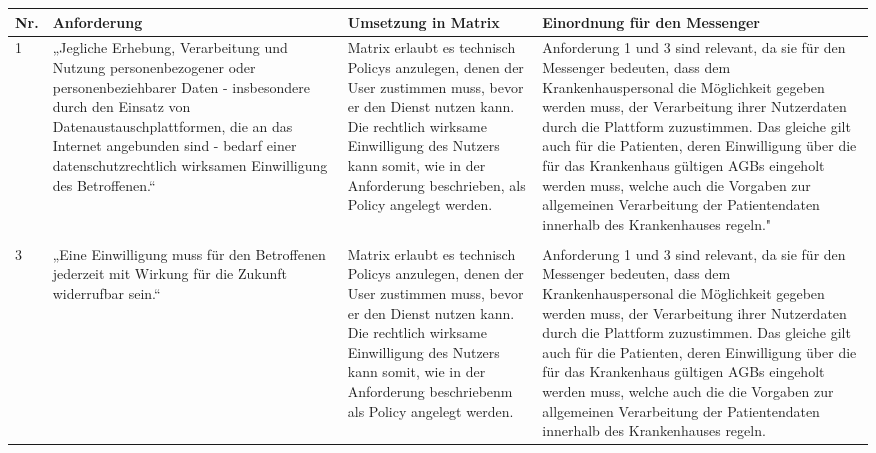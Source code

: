 \begin{longtable}{p{0.6cm}|p{4cm}|p{5cm}|p{5cm}}
    \hline
Nr. & Anforderung                                                                                                                                                                                                                                                                                          & Umsetzung in Matrix          & Einordnung für den Messenger                                                                                                                                                                                                                                                                                                                                                                                                                                                                                                                                        \\ \hline
1 &
  „Jegliche Erhebung, Verarbeitung und Nutzung personenbezogener oder personenbeziehbarer Daten - insbesondere durch den Einsatz von Datenaustauschplattformen, die an das Internet angebunden sind - bedarf einer datenschutzrechtlich wirksamen Einwilligung des Betroffenen.“ &
  Matrix erlaubt es technisch Policys anzulegen, denen der User zustimmen muss, bevor er den Dienst nutzen kann. Die rechtlich wirksame Einwilligung des Nutzers kann somit, wie in der Anforderung beschrieben, als Policy angelegt werden. &
  Anforderung 1 und 3 sind relevant, da sie für den Messenger bedeuten, dass dem Krankenhauspersonal die Möglichkeit gegeben werden muss, der Verarbeitung ihrer Nutzerdaten durch die Plattform zuzustimmen. Das gleiche gilt auch für die Patienten, deren Einwilligung über die für das Krankenhaus gültigen AGBs eingeholt werden muss, welche auch die Vorgaben zur allgemeinen Verarbeitung der Patientendaten innerhalb des Krankenhauses regeln." \\
  \\ \hline
  3 &
  „Eine Einwilligung muss für den Betroffenen jederzeit mit Wirkung für die Zukunft widerrufbar sein.“ &
  Matrix erlaubt es technisch Policys anzulegen, denen der User zustimmen muss, bevor er den Dienst nutzen kann. Die rechtlich wirksame Einwilligung des Nutzers kann somit, wie in der Anforderung beschriebenm als Policy angelegt werden. &
  Anforderung 1 und 3 sind relevant, da sie für den Messenger bedeuten, dass dem Krankenhauspersonal die Möglichkeit gegeben werden muss, der Verarbeitung ihrer Nutzerdaten durch die Plattform zuzustimmen. Das gleiche gilt auch für die Patienten, deren Einwilligung über die für das Krankenhaus gültigen AGBs eingeholt werden muss, welche auch die die Vorgaben zur allgemeinen Verarbeitung der Patientendaten innerhalb des Krankenhauses regeln. \\

\end{longtable}
